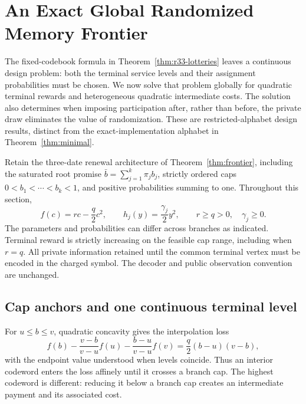 \section{An Exact Global Randomized Memory Frontier}\label{sec:r34-global}
The fixed-codebook formula in Theorem~\ref{thm:r33-lotteries} leaves a continuous design problem: both the terminal service levels and their assignment probabilities must be chosen. We now solve that problem globally for quadratic terminal rewards and heterogeneous quadratic intermediate costs. The solution also determines when imposing participation after, rather than before, the private draw eliminates the value of randomization. These are restricted-alphabet design results, distinct from the exact-implementation alphabet in Theorem~\ref{thm:minimal}.

Retain the three-date renewal architecture of Theorem~\ref{thm:frontier}, including the saturated root promise $\bar b=\sum_{j=1}^k\pi_jb_j$, strictly ordered caps $0<b_1<\cdots<b_k<1$, and positive probabilities summing to one. Throughout this section,
\begin{equation}\label{eq:r34-primitives}
 f(c)=rc-\frac q2c^2,\qquad h_j(y)=\frac{\gamma_j}{2}y^2,
 \qquad r\geq q>0,\quad \gamma_j\geq0.
\end{equation}
The parameters and probabilities can differ across branches as indicated. Terminal reward is strictly increasing on the feasible cap range, including when $r=q$. All private information retained until the common terminal vertex must be encoded in the charged symbol. The decoder and public observation convention are unchanged.

\subsection{Cap anchors and one continuous terminal level}
For $u\leq b\leq v$, quadratic concavity gives the interpolation loss
\begin{equation}\label{eq:r34-chord}
 f(b)-\frac{v-b}{v-u}f(u)-\frac{b-u}{v-u}f(v)
 =\frac q2(b-u)(v-b),
\end{equation}
with the endpoint value understood when levels coincide. Thus an interior codeword enters the loss affinely until it crosses a branch cap. The highest codeword is different: reducing it below a branch cap creates an intermediate payment and its associated cost.

